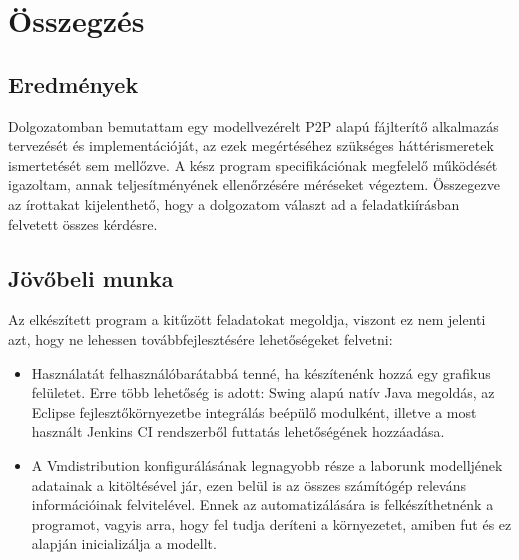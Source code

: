 \chapter{Összegzés}
\label{chp:summary}

\section{Eredmények}
Dolgozatomban bemutattam egy modellvezérelt P2P alapú fájlterítő alkalmazás tervezését és implementációját, az ezek megértéséhez szükséges háttérismeretek ismertetését sem mellőzve. A kész program specifikációnak megfelelő működését igazoltam, annak teljesítményének ellenőrzésére méréseket végeztem. Összegezve az írottakat kijelenthető, hogy a dolgozatom választ ad a feladatkiírásban felvetett összes kérdésre.

\section{Jövőbeli munka}
Az elkészített program a kitűzött feladatokat megoldja, viszont ez nem jelenti azt, hogy ne lehessen továbbfejlesztésére lehetőségeket felvetni:
\begin{itemize}
  \item Használatát felhasználóbarátabbá tenné, ha készítenénk hozzá egy grafikus felületet. Erre több lehetőség is adott: Swing\cite{zukowski2005definitive} alapú natív Java megoldás, az Eclipse fejlesztőkörnyezetbe integrálás beépülő modulként, illetve a most használt Jenkins CI rendszerből futtatás lehetőségének hozzáadása.
  \item A Vmdistribution konfigurálásának legnagyobb része a laborunk modelljének adatainak a kitöltésével jár, ezen belül is az összes számítógép releváns információinak felvitelével. Ennek az automatizálására is felkészíthetnénk a programot, vagyis arra, hogy fel tudja deríteni a környezetet, amiben fut és ez alapján inicializálja a modellt.
\end{itemize}
